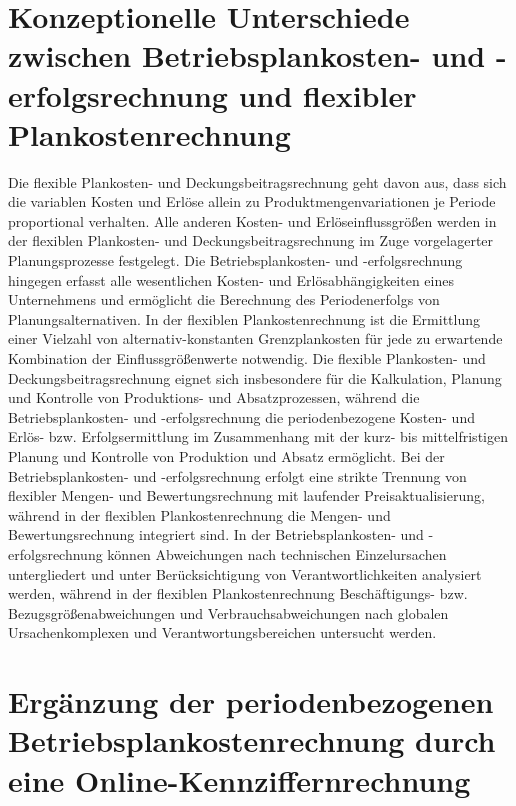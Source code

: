 \section{Konzeptionelle Unterschiede zwischen Betriebsplankosten- und -erfolgsrechnung und flexibler Plankostenrechnung}

Die flexible Plankosten- und Deckungsbeitragsrechnung geht davon aus, dass sich die variablen Kosten und Erlöse allein zu Produktmengenvariationen je Periode proportional verhalten. Alle anderen Kosten- und Erlöseinflussgrö{\ss}en werden in der flexiblen Plankosten- und Deckungsbeitragsrechnung im Zuge vorgelagerter Planungsprozesse festgelegt. Die Betriebsplankosten- und -erfolgsrechnung hingegen erfasst alle wesentlichen Kosten- und Erlösabhängigkeiten eines Unternehmens und ermöglicht die Berechnung des Periodenerfolgs von Planungsalternativen. In der flexiblen Plankostenrechnung ist die Ermittlung einer Vielzahl von alternativ-konstanten Grenzplankosten für jede zu erwartende Kombination der Einflussgrö{\ss}enwerte notwendig. Die flexible Plankosten- und Deckungsbeitragsrechnung eignet sich insbesondere für die Kalkulation, Planung und Kontrolle von Produktions- und Absatzprozessen, während die Betriebsplankosten- und -erfolgsrechnung die periodenbezogene Kosten- und Erlös- bzw. Erfolgsermittlung im Zusammenhang mit der kurz- bis mittelfristigen Planung und Kontrolle von Produktion und Absatz ermöglicht. Bei der Betriebsplankosten- und -erfolgsrechnung erfolgt eine strikte Trennung von flexibler Mengen- und Bewertungsrechnung mit laufender Preisaktualisierung, während in der flexiblen Plankostenrechnung die Mengen- und Bewertungsrechnung integriert sind. In der Betriebsplankosten- und -erfolgsrechnung können Abweichungen nach technischen Einzelursachen untergliedert und unter Berücksichtigung von Verantwortlichkeiten analysiert werden, während in der flexiblen Plankostenrechnung Beschäftigungs- bzw. Bezugsgrö{\ss}enabweichungen und Verbrauchsabweichungen nach globalen Ursachenkomplexen und Verantwortungsbereichen untersucht werden.

\section{Ergänzung der periodenbezogenen Betriebsplankostenrechnung durch eine Online-Kennziffernrechnung}

